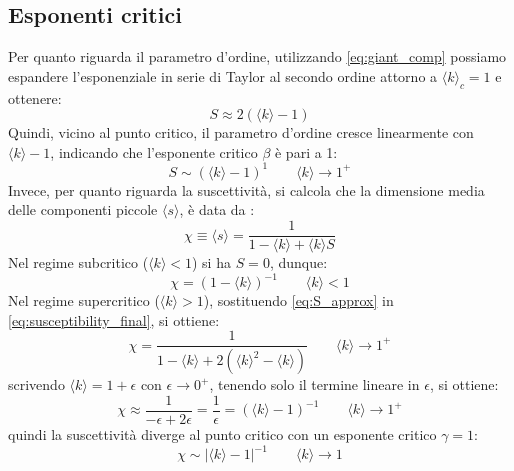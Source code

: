 \documentclass[12pt,italian]{article}
\begin{document}
\subsection{Esponenti critici} \label{sec:esponenti}
Per quanto riguarda il parametro d'ordine, utilizzando \eqref{eq:giant_comp} possiamo espandere l'esponenziale in serie di Taylor al secondo ordine attorno a $\langle k \rangle_c = 1$ e ottenere:
\begin{equation}
    S \approx 2(\langle k \rangle - 1)
    \label{eq:S_approx}
\end{equation}
Quindi, vicino al punto critico, il parametro d'ordine cresce linearmente con $\langle k \rangle - 1$, indicando che l'esponente critico $\beta$ è pari a 1:
\begin{equation}
    S \sim (\langle k \rangle - 1)^1 \quad\quad \langle k \rangle \to 1^+
\end{equation}
Invece, per quanto riguarda la suscettività, si calcola che la dimensione media delle componenti piccole $ \langle s \rangle$, è data da \cite{newman2018networks}:
\begin{equation}
    \chi \equiv \langle s \rangle = \frac{1}{1 - \langle k \rangle + \langle k \rangle S}
    \label{eq:susceptibility_final}
\end{equation}
Nel regime subcritico ($\langle k \rangle < 1$) si ha $S = 0$, dunque:
\begin{equation}
    \chi = (1- \langle k \rangle)^{-1} \quad\quad \langle k \rangle < 1
\end{equation}
Nel regime supercritico ($\langle k \rangle > 1$), sostituendo \eqref{eq:S_approx} in \eqref{eq:susceptibility_final}, si ottiene:
\begin{equation}
    \chi = \frac{1}{1 - \langle k \rangle + 2(\langle k \rangle^2 - \langle k \rangle)} \quad\quad  \langle k \rangle \to 1^+
\end{equation}
scrivendo $\langle k \rangle = 1 + \epsilon$ con $\epsilon \to 0^+$, tenendo solo il termine lineare in $\epsilon$, si ottiene:
\begin{equation}
    \chi \approx \frac{1}{- \epsilon + 2\epsilon} = \frac{1}{\epsilon} = ( \langle k \rangle - 1)^{-1} \quad\quad  \langle k \rangle \to 1^+
\end{equation}
quindi la suscettività diverge al punto critico con un esponente critico $\gamma = 1$:
\begin{equation}
    \chi \sim |\langle k \rangle - 1|^{-1} \quad\quad \langle k \rangle \to 1
\end{equation}
\end{document}
